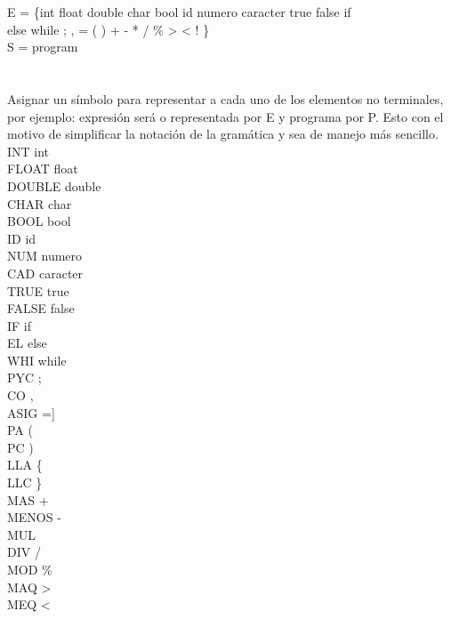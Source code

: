 \documentclass[a4paper,10pt]{article}
\begin{document}
\noindent
E = \{int float double char bool id numero caracter true false if\\
\-\hspace{1cm}else while ; , = ( ) { } + - * / \% > < ! \}\\

\noindent
S = program

\section{}
Asignar un símbolo para representar a cada uno de los elementos no
terminales, por ejemplo: expresión será o representada por E y programa por P.
Esto con el motivo de simplificar la notación de la gramática y sea de manejo
más sencillo.
\\

\noindent
    INT \rightarrow int\\
    FLOAT \rightarrow float\\
    DOUBLE \rightarrow double\\
    CHAR \rightarrow char\\
    BOOL \rightarrow bool\\
    ID \rightarrow id\\
    NUM \rightarrow numero\\
    CAD \rightarrow caracter\\
    TRUE \rightarrow true\\
    FALSE \rightarrow false\\
    IF \rightarrow if\\
    EL \rightarrow else\\
    WHI \rightarrow while\\
    PYC \rightarrow ;\\
    CO \rightarrow ,\\
    ASIG \rightarrow =]\\
    PA \rightarrow (\\
    PC \rightarrow )\\
    LLA \rightarrow \{\\
    LLC \rightarrow \}\\
    MAS \rightarrow +\\
    MENOS \rightarrow - \\
    MUL \rightarrow *\\
    DIV \rightarrow /\\
    MOD \rightarrow \%\\
    MAQ \rightarrow >\\
    MEQ \rightarrow <\\
\end{document}
